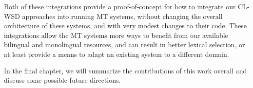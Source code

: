 Both of these integrations provide a proof-of-concept for how to integrate our
CL-WSD approaches into running MT systems, without changing the overall
architecture of these systems, and with very modest changes to their code. These
integrations allow the MT systems more ways to benefit from our available
bilingual and monolingual resources, and can result in better lexical
selection, or at least provide a means to adapt an existing system to a
different domain.

In the final chapter, we will summarize the contributions of this work overall
and discuss some possible future directions.
